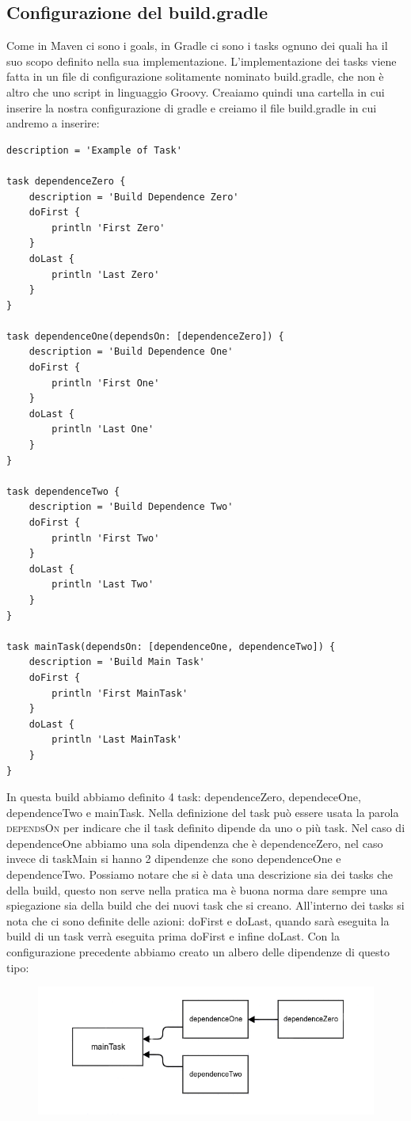 \subsection{Configurazione del build.gradle}
\label{buildGradle}
Come in Maven ci sono i goals, in Gradle ci sono i tasks ognuno dei quali ha il suo scopo definito nella sua implementazione. L'implementazione dei tasks viene fatta in un file di configurazione solitamente nominato build.gradle, che non è altro che uno script in linguaggio Groovy. Creaiamo quindi una cartella in cui inserire la nostra configurazione di gradle e creiamo il file build.gradle in cui andremo a inserire:
\begin{lstlisting}[frame=single]
description = 'Example of Task'

task dependenceZero {
	description = 'Build Dependence Zero'
	doFirst {
		println 'First Zero'
	}
	doLast {
		println 'Last Zero'
	}
}

task dependenceOne(dependsOn: [dependenceZero]) {
	description = 'Build Dependence One'
	doFirst {
		println 'First One'
	}
	doLast {
		println 'Last One'
	}
}

task dependenceTwo {
	description = 'Build Dependence Two'
	doFirst {
		println 'First Two'
	}
	doLast {
		println 'Last Two'
	}
}

task mainTask(dependsOn: [dependenceOne, dependenceTwo]) {
	description = 'Build Main Task'
	doFirst {
		println 'First MainTask'
	}
	doLast {
		println 'Last MainTask'
	}
}
\end{lstlisting}
In questa build abbiamo definito 4 task: dependenceZero, dependeceOne, dependenceTwo e mainTask. Nella definizione del task può essere usata la parola \textsc{dependsOn} per indicare che il task definito dipende da uno o più task. Nel caso di dependenceOne abbiamo una sola dipendenza che è dependenceZero, nel caso invece di taskMain si hanno 2 dipendenze che sono dependenceOne e dependenceTwo. Possiamo notare che si è data una descrizione sia dei tasks che della build, questo non serve nella pratica ma è buona norma dare sempre una spiegazione sia della build che dei nuovi task che si creano. All'interno dei tasks si nota che ci sono definite delle azioni: doFirst e doLast, quando sarà eseguita la build di un task verrà eseguita prima doFirst e infine doLast. Con la configurazione precedente abbiamo creato un albero delle dipendenze di questo tipo:
\begin{figure}[H]
\includegraphics[scale=0.40]{1Task/task_taskDep/graphDep.png}
\end{figure}
